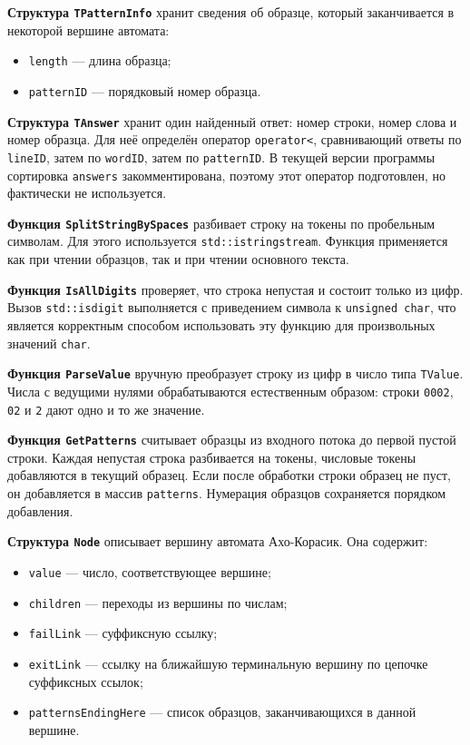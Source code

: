 \documentclass[12pt]{article}
\begin{document}
\textbf{Структура \texttt{TPatternInfo}} хранит сведения об образце, который заканчивается в некоторой вершине автомата:
\begin{itemize}
    \item \texttt{length} --- длина образца;
    \item \texttt{patternID} --- порядковый номер образца.
\end{itemize}

\textbf{Структура \texttt{TAnswer}} хранит один найденный ответ: номер строки, номер слова и номер образца. Для неё определён оператор \texttt{operator<}, сравнивающий ответы по \texttt{lineID}, затем по \texttt{wordID}, затем по \texttt{patternID}. В текущей версии программы сортировка \texttt{answers} закомментирована, поэтому этот оператор подготовлен, но фактически не используется.

\textbf{Функция \texttt{SplitStringBySpaces}} разбивает строку на токены по пробельным символам. Для этого используется \texttt{std::istringstream}. Функция применяется как при чтении образцов, так и при чтении основного текста.

\textbf{Функция \texttt{IsAllDigits}} проверяет, что строка непустая и состоит только из цифр. Вызов \texttt{std::isdigit} выполняется с приведением символа к \texttt{unsigned char}, что является корректным способом использовать эту функцию для произвольных значений \texttt{char}.

\textbf{Функция \texttt{ParseValue}} вручную преобразует строку из цифр в число типа \texttt{TValue}. Числа с ведущими нулями обрабатываются естественным образом: строки \texttt{0002}, \texttt{02} и \texttt{2} дают одно и то же значение.

\textbf{Функция \texttt{GetPatterns}} считывает образцы из входного потока до первой пустой строки. Каждая непустая строка разбивается на токены, числовые токены добавляются в текущий образец. Если после обработки строки образец не пуст, он добавляется в массив \texttt{patterns}. Нумерация образцов сохраняется порядком добавления.

\textbf{Структура \texttt{Node}} описывает вершину автомата Ахо-Корасик. Она содержит:
\begin{itemize}
    \item \texttt{value} --- число, соответствующее вершине;
    \item \texttt{children} --- переходы из вершины по числам;
    \item \texttt{failLink} --- суффиксную ссылку;
    \item \texttt{exitLink} --- ссылку на ближайшую терминальную вершину по цепочке суффиксных ссылок;
    \item \texttt{patternsEndingHere} --- список образцов, заканчивающихся в данной вершине.
\end{itemize}
\end{document}
